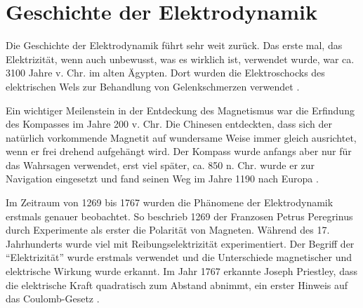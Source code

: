 %
%
%
\section{Geschichte der Elektrodynamik\label{maxwell:section:teil0}}

Die Geschichte der Elektrodynamik führt sehr weit zurück.
Das erste mal, das Elektrizität, wenn auch unbewusst, was es wirklich ist, verwendet wurde, war ca. 3100 Jahre v. Chr. im alten Ägypten.
Dort wurden die Elektroschocks des elektrischen Wels zur Behandlung von Gelenkschmerzen verwendet \cite{maxwell:History_of_bioelectricity}.

Ein wichtiger Meilenstein in der Entdeckung des Magnetismus war die Erfindung des Kompasses im Jahre 200 v. Chr.
Die Chinesen entdeckten, dass sich der natürlich vorkommende Magnetit auf wundersame Weise immer gleich ausrichtet, wenn er frei drehend aufgehängt wird.
Der Kompass wurde anfangs aber nur für das Wahrsagen verwendet, erst viel später, ca. 850 n. Chr. wurde er zur Navigation eingesetzt und fand seinen Weg im Jahre 1190 nach Europa \cite{maxwell:History_of_the_compass}.

Im Zeitraum von 1269 bis 1767 wurden die Phänomene der Elektrodynamik erstmals genauer beobachtet.
So beschrieb 1269 der Franzosen Petrus Peregrinus durch Experimente als erster die Polarität von Magneten.
Während des 17. Jahrhunderts wurde viel mit Reibungselektrizität experimentiert. Der Begriff der ``Elektrizität'' wurde erstmals verwendet und die Unterschiede magnetischer und elektrische Wirkung wurde erkannt.
Im Jahr 1767 erkannte Joseph Priestley, dass die elektrische Kraft quadratisch zum Abstand abnimmt, ein erster Hinweis auf das Coulomb-Gesetz \cite{maxwell:History_of_electromagnetic_theory}.

